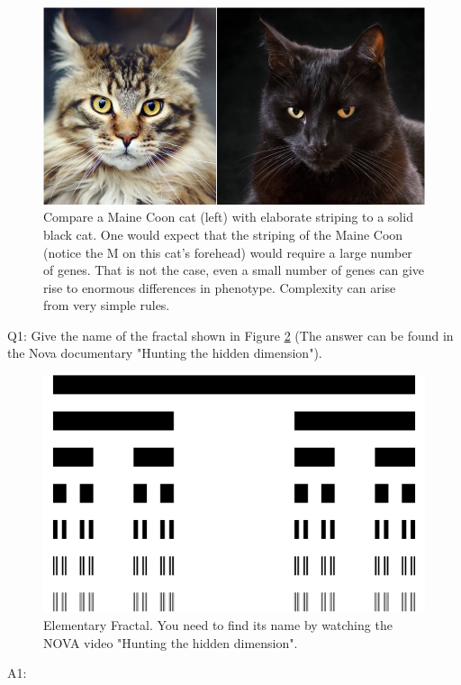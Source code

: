 \documentclass[12pt,letterpaper]{article}
\begin{document}
\begin{figure}
\centering
\includegraphics[width=1\linewidth]{MaineCoon_SolidBlackCat}
\caption{Compare a Maine Coon cat (left) with elaborate striping to a solid black cat. One would expect that the striping of the Maine Coon (notice the M on this cat's forehead) would require a large number of genes. That is not the case, even a small number of genes can give rise to enormous differences in phenotype. Complexity can arise from very simple rules.}
\label{fig:MaineCoon_SolidBlackCat}
\end{figure}

Q1: Give the name of the fractal shown in Figure \ref{fig:HW_Q1Fractal} (The answer can be found in the Nova documentary "Hunting the hidden dimension").

\begin{figure}
\centering
\includegraphics[width=0.6\linewidth]{HW_Q1Fractal}
\caption{Elementary Fractal. You need to find its name by watching the NOVA video "Hunting the hidden dimension".}
\label{fig:HW_Q1Fractal}
\end{figure}

A1:
\end{document}
